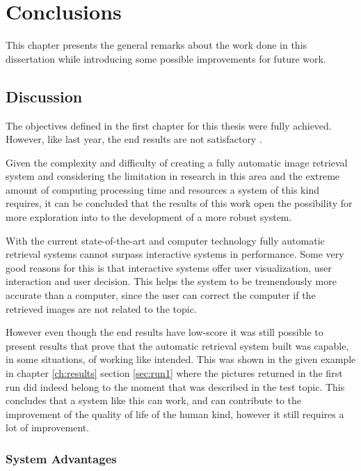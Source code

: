 \cleardoublepage
\chapter{Conclusions}
\label{ch:conclusions}

This chapter presents the general remarks about the work done in this dissertation while introducing some possible improvements for future work.

\section{Discussion}

The objectives defined in the first chapter for this thesis were fully achieved. However, like last year, the end results are not satisfactory .


Given the complexity and difficulty of creating a fully automatic image retrieval system and considering the limitation in research in this area and the extreme amount of computing processing time and resources a system of this kind requires, it can be concluded that the results of this work open the possibility for more exploration into to the development of a more robust system.


With the current state-of-the-art and computer technology fully automatic retrieval systems cannot surpass interactive systems in performance. Some very good reasons for this is that interactive systems offer user visualization, user interaction and user decision. This helps the system to be tremendously more accurate than a computer, since the user can correct the computer if the retrieved images are not related to the topic.


However even though the end results have low-score it was still possible to present results that prove that the automatic retrieval system built was capable, in some situations, of working like intended. This was shown in the given example in chapter \ref{ch:results} section \ref{sec:run1} where the pictures returned in the first run did indeed belong to the moment that was described in the test topic. This concludes that a system like this can work, and can contribute to the improvement of the quality of life of the human kind, however it still requires a lot of improvement.



\subsection{System Advantages}

